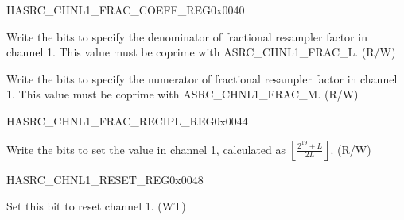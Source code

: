 \begin{register}{H}{ASRC\_CHNL1\_FRAC\_COEFF\_REG}{0x0040}\label{regdesc:ASRCCHNL1FRACCOEFFREG}
%
%
%
\regnewline%
\begin{regdesc}\begin{reglist}
\label{fielddesc:ASRCCHNL1FRACM}\item [ASRC\_CHNL1\_FRAC\_M] Write the bits to specify the denominator of fractional resampler factor in channel 1. This value must be coprime with ASRC\_CHNL1\_FRAC\_L. (R/W)
\label{fielddesc:ASRCCHNL1FRACL}\item [ASRC\_CHNL1\_FRAC\_L] Write the bits to specify the numerator of fractional resampler factor in channel 1. This value must be coprime with ASRC\_CHNL1\_FRAC\_M. (R/W)
\end{reglist}\end{regdesc}
\end{register}


\begin{register}{H}{ASRC\_CHNL1\_FRAC\_RECIPL\_REG}{0x0044}\label{regdesc:ASRCCHNL1FRACRECIPLREG}
%
%
\regnewline%
\begin{regdesc}\begin{reglist}
\label{fielddesc:ASRCCHNL1FRACRECIPL}\item [ASRC\_CHNL1\_FRAC\_RECIPL] Write the bits to set the value in channel 1, calculated as \(\left\lfloor \frac{2^{19} + L}{2L} \right\rfloor\). (R/W)
\end{reglist}\end{regdesc}
\end{register}


\begin{register}{H}{ASRC\_CHNL1\_RESET\_REG}{0x0048}\label{regdesc:ASRCCHNL1RESETREG}
%
%
\regnewline%
\begin{regdesc}\begin{reglist}
\label{fielddesc:ASRCCHNL1RESET}\item [ASRC\_CHNL1\_RESET] Set this bit to reset channel 1. (WT)
\end{reglist}\end{regdesc}
\end{register}



